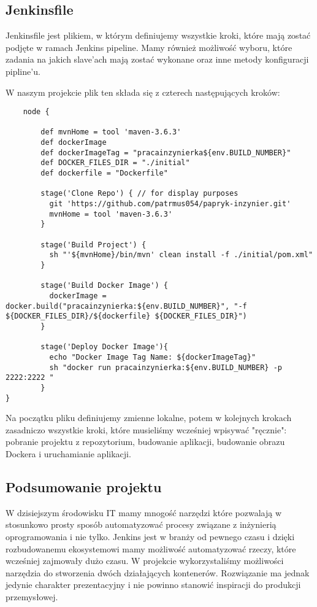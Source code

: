 \subsection{Jenkinsfile} 
Jenkinsfile jest plikiem, w którym definiujemy wszystkie kroki, które mają zostać podjęte w ramach Jenkins pipeline. Mamy również możliwość wyboru, które zadania na jakich slave'ach mają zostać wykonane oraz inne metody konfiguracji pipline'u.

W naszym projekcie plik ten składa się z czterech następujących kroków:

\begin{lstlisting}
    node {  
        
	    def mvnHome = tool 'maven-3.6.3'
	    def dockerImage
	    def dockerImageTag = "pracainzynierka${env.BUILD_NUMBER}"
		def DOCKER_FILES_DIR = "./initial"
		def dockerfile = "Dockerfile"
	    
	    stage('Clone Repo') { // for display purposes
	      git 'https://github.com/patrmus054/papryk-inzynier.git'           
	      mvnHome = tool 'maven-3.6.3'
	    }    
	  
	    stage('Build Project') {
	      sh "'${mvnHome}/bin/mvn' clean install -f ./initial/pom.xml"
	    }
			
	    stage('Build Docker Image') {
	      dockerImage = docker.build("pracainzynierka:${env.BUILD_NUMBER}", "-f ${DOCKER_FILES_DIR}/${dockerfile} ${DOCKER_FILES_DIR}")
	    }
	   
	    stage('Deploy Docker Image'){
	      echo "Docker Image Tag Name: ${dockerImageTag}"
		  sh "docker run pracainzynierka:${env.BUILD_NUMBER} -p 2222:2222 "
	    }
}
\end{lstlisting}

Na początku pliku definiujemy zmienne lokalne, potem w kolejnych krokach zasadniczo wszystkie kroki, które musieliśmy wcześniej wpisywać "ręcznie": pobranie projektu z repozytorium, budowanie aplikacji, budowanie obrazu Dockera i uruchamianie aplikacji. 

\subsection{Podsumowanie projektu}

W dzisiejszym środowisku IT mamy mnogość narzędzi które pozwalają w stosunkowo prosty sposób automatyzować procesy związane z inżynierią oprogramowania i nie tylko. Jenkins jest w branży od pewnego czasu i dzięki rozbudowanemu ekosystemowi mamy możliwość automatyzować rzeczy, które wcześniej zajmowały dużo czasu. W projekcie wykorzystaliśmy możliwości narzędzia do stworzenia dwóch działających kontenerów. Rozwiązanie ma jednak jedynie charakter prezentacyjny i nie powinno stanowić inspiracji do produkcji przemysłowej. 
